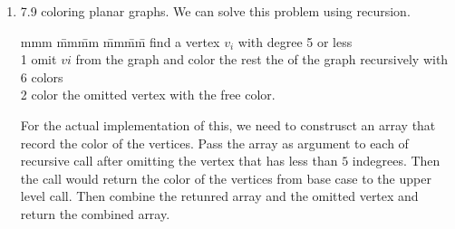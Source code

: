 \documentclass[11pt]{article}
\begin{document}
\begin{enumerate}
part(d) (Implement greedy coloring in linear time)
let $l.color$ be the array of the color of all the vertices in order. $l.color$ has size $|V|$. $l.used$ be the array of the color used for coloring. $l.used$ has size $D+1$ where $D$ is the maximum in degree for all vertices. 

Input: adj list representation of graph $G$.\\
Output: a legal coloring using less equal than $D+1$ colorings.\\

Pseudocode:
\begin{tabbing}
mmm \= mm\= mm \= mm\= mm\= \kill
Initialization\\
0 \> set all entires of $l.color$ and $l.used$ to 0\\
0 \> \bfor\ each vertex $v$ in $G$\\

Coloring\\
1 \> \bfor\ each vertex $v$ in $G$\\
2 \> \> \bfor\ each vertex $w$ in $v.adj$\\
3 \> \> \> \bif\ $l.color(w) > 0$ \\
4 \> \> \> \> $l.used(l.color(w)) = 1$\\
5 \> \> \> $l.color(v)=$ search($l.used$)\\
6 \> \> \bfor\ each vertex $s$ in $v.adj$\\
7 \> \> \> \bif\ $l.color(w) > 0$\\
8 \> \> \> \> $l.used(l.color(w)) = 0$\\

\\
search($list$)\\
0 \> \bfor\ $i$ from 0 to length(list)\\
1 \> \> \bif\ $list(i) == 0$\\
2 \> \> \> \breturn\ i \\
3 \> \bend\ \\
\end{tabbing}

\item 7.9 coloring planar graphs.
We can solve this problem using recursion.

\begin{tabbing}
mmm \= mm\= mm \= mm\= mm\=  \> find a vertex $v_i$ with degree 5 or less\\
1 \> omit $vi$ from the graph and color the rest the of the graph recursively with 6 colors\\
2 \> color the omitted vertex with the free color.\\
\end{tabbing}
For the actual implementation of this, we need to construsct an array that record the color of the vertices. Pass the array as argument to each of recursive call after omitting the vertex that has less than $5$ indegrees. Then the call would return the color of the vertices from base case to the upper level call. Then combine the retunred array and the omitted vertex and return the combined array.  
\end{enumerate}
\end{document}
